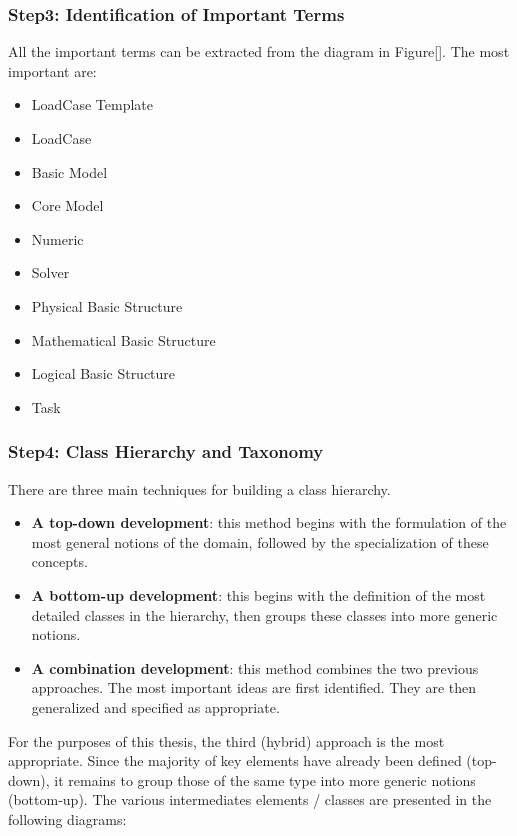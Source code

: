     \subsubsection{Step3: Identification of Important Terms}
    All the important terms can be extracted from the diagram in Figure[]. The most important are:
    \begin{itemize}
        \item LoadCase Template
        \item LoadCase
        \item Basic Model
        \item Core Model
        \item Numeric 
        \item Solver
        \item Physical Basic Structure
        \item Mathematical Basic Structure
        \item Logical Basic Structure
        \item Task
    \end{itemize}

    
    \subsubsection{Step4: Class Hierarchy and Taxonomy}
    There are three main techniques for building a class hierarchy.
    \begin{itemize}
        \item \textbf{A top-down development}: this method begins with the formulation of the most general notions of the domain, followed by the specialization of these concepts.
        \item \textbf{A bottom-up development}: this begins with the definition of the most detailed classes in the hierarchy, then groups these classes into more generic notions.
        \item \textbf{A combination development}: this method combines the two previous approaches. The most important ideas are first identified. They are then generalized and specified as appropriate.
    \end{itemize}
    
    For the purposes of this thesis, the third (hybrid) approach is the most appropriate. Since the majority of key elements have already been defined (top-down), it remains to group those of the same type into more generic notions (bottom-up). The various intermediates elements / classes are presented in the following diagrams:
    

